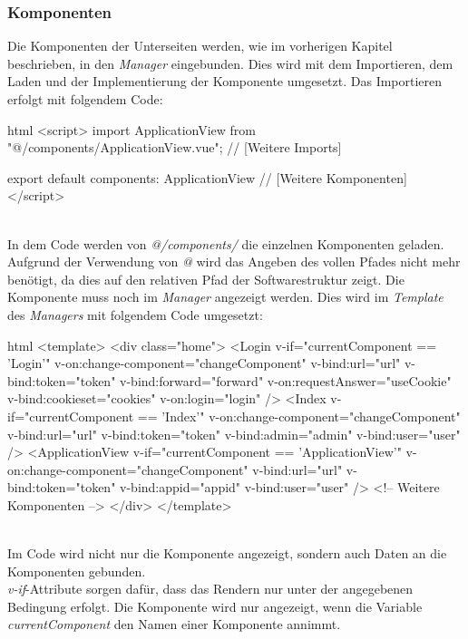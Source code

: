\subsubsection{Komponenten}
Die Komponenten der Unterseiten werden, wie im vorherigen Kapitel beschrieben, in den \textit{Manager} eingebunden. Dies wird mit dem Importieren, dem Laden und der Implementierung der Komponente umgesetzt.
Das Importieren erfolgt mit folgendem Code:
\begin{code}{html}
	<script>
	import ApplicationView from "@/components/ApplicationView.vue";
	// [Weitere Imports]
	
	export default {
		components: {
			ApplicationView
			// [Weitere Komponenten]
		}
	}
</script>
\end{code}
~\\
In dem Code werden von \textit{@/components/} die einzelnen Komponenten geladen. Aufgrund der Verwendung von \textit{@} wird das Angeben des vollen Pfades nicht mehr benötigt, da dies auf den relativen Pfad der Softwarestruktur zeigt.
\newpage
Die Komponente muss noch im \textit{Manager} angezeigt werden. Dies wird im \textit{Template} des \textit{Managers} mit folgendem Code umgesetzt:
\begin{code}{html}
<template>
	<div class="home">
		<Login
			v-if="currentComponent == 'Login'"
			v-on:change-component="changeComponent"
			v-bind:url="url"
			v-bind:token="token"
			v-bind:forward="forward"
			v-on:requestAnswer="useCookie"
			v-bind:cookieset="cookies"
			v-on:login="login"
		/>
		<Index
			v-if="currentComponent == 'Index'"
			v-on:change-component="changeComponent"
			v-bind:url="url"
			v-bind:token="token"
			v-bind:admin="admin"
			v-bind:user="user"
		/>
		<ApplicationView
			v-if="currentComponent == 'ApplicationView'"
			v-on:change-component="changeComponent"
			v-bind:url="url"
			v-bind:token="token"
			v-bind:appid="appid"
			v-bind:user="user"
		/>
		<!-- Weitere Komponenten -->
	</div>
</template>
\end{code}
~\\
Im Code wird nicht nur die Komponente angezeigt, sondern auch Daten an die Komponenten gebunden.\\
\textit{v-if}-Attribute sorgen dafür, dass das Rendern nur unter der angegebenen Bedingung erfolgt. Die Komponente wird nur angezeigt, wenn die Variable \textit{currentComponent} den Namen einer Komponente annimmt.\\
